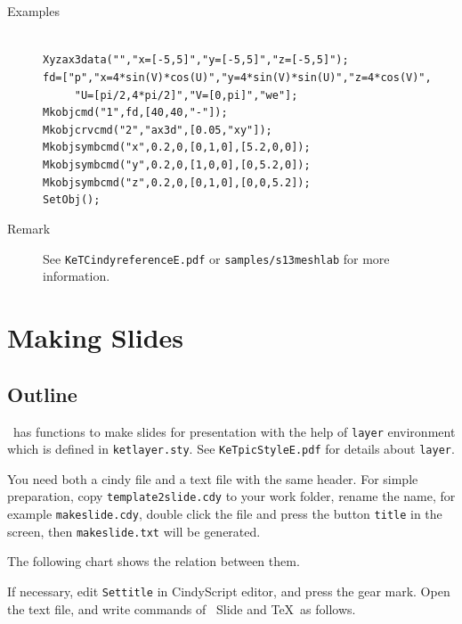 \documentclass[papersize,a4paper,12pt]{article}
\begin{document}
\begin{description}
\item[Examples]\mbox{}\\
\verb|Xyzax3data("","x=[-5,5]","y=[-5,5]","z=[-5,5]");|\\
\verb|fd=["p","x=4*sin(V)*cos(U)","y=4*sin(V)*sin(U)","z=4*cos(V)",|\\
\verb|     "U=[pi/2,4*pi/2]","V=[0,pi]","we"];|\\
\verb|Mkobjcmd("1",fd,[40,40,"-"]);|\\
\verb|Mkobjcrvcmd("2","ax3d",[0.05,"xy"]);|\\
\verb|Mkobjsymbcmd("x",0.2,0,[0,1,0],[5.2,0,0]);|\\
\verb|Mkobjsymbcmd("y",0.2,0,[1,0,0],[0,5.2,0]);|\\
\verb|Mkobjsymbcmd("z",0.2,0,[0,1,0],[0,0,5.2]);|\\
\verb|SetObj();|
\item[Remark]See \verb|KeTCindyreferenceE.pdf| or \verb|samples/s13meshlab| for more information.
\end{description}


\newpage

\section{Making Slides}

\subsection{Outline}

\ketcindy\ has functions to make slides for presentation with the help of \verb|layer| environment which is defined in \verb|ketlayer.sty|.
See \verb|KeTpicStyleE.pdf| for details about \verb|layer|.

You need both a cindy file and a text file with the same header.  For simple preparation, copy \verb|template2slide.cdy| to your work folder, rename the name, for example \verb|makeslide.cdy|, double click the file and press the button \verb|title| in the screen, then \verb|makeslide.txt| will be generated.

The following chart shows the relation between them.

\begin{center}

\end{center}

If necessary, edit \verb|Settitle| in CindyScript editor, and press the gear mark. Open the text file, and write commands of \ketcindy\ Slide and \TeX\ as follows.
\end{document}
